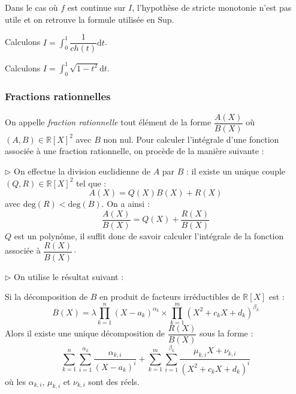 \documentclass[french,11pt,twoside]{VcCours}
\newcommand{\dt}{\text{d}t}
\begin{document}
\begin{Remarque}{} Dans le cas où $f$ est continue sur $I$, l'hypothèse de stricte monotonie n'est pas utile et on retrouve la formule utilisée en Sup.
\end{Remarque}

\newpage
\begin{Exemple} Calculons $I= \int_{0}^1 \dfrac{1}{ch(t)} \dt$.

\vspace*{7cm}
\end{Exemple}

\begin{Exemple} Calculons $I= \int_{0}^1 \sqrt{1-t^2} \dt$.

\vspace*{7cm}
\end{Exemple}


\subsubsection{Fractions rationnelles}

On appelle \emph{fraction rationnelle} tout élément de la forme $\dfrac{A(X)}{B(X)}$ où $(A,B) \in \mathbb{R}[X]^2$ avec $B$ non nul. Pour calculer l'intégrale d'une fonction associée à une fraction rationnelle, on procède de la manière suivante : 

\bigskip

$\rhd$ On effectue la division euclidienne de $A$ par $B$ : il existe un unique couple $(Q,R) \in \mathbb{R}[X]^2$ tel que :
$$ A(X) = Q(X)B(X) + R(X)$$
avec $\textrm{deg}(R)< \textrm{deg}(B)$. On a ainsi :
$$ \dfrac{A(X)}{B(X)} = Q(X) + \dfrac{R(X)}{B(X)}$$
$Q$ est un polynôme, il suffit donc de savoir calculer l'intégrale de la fonction associée à $\dfrac{R(X)}{B(X)} \cdot$

$\rhd$ On utilise le résultat suivant :

\begin{Theoreme}{} Si la décomposition de $B$ en produit de facteurs irréductibles de $\mathbb{R}[X]$ est :
$$ B(X) = \lambda \prod_{k=1}^n (X-a_k)^{\alpha_k} \times \prod_{k=1}^m (X^2+ c_k X + d_k)^{\beta_k} $$
Alors il existe une unique décomposition de $\dfrac{R(X)}{B(X)}$ sous la forme :
$$ \sum_{k=1}^n \sum_{i=1}^{\alpha_k} \frac{\alpha_{k,i}}{(X-a_k)^{i}} + \sum_{k=1}^m \sum_{i=1}^{\beta_k} \dfrac{\mu_{k,i} X + \nu_{k,i}}{(X^2+ c_k X + d_k)^i} $$
où les $\alpha_{k,i}$, $\mu_{k,i}$ et $\nu_{k,i}$ sont des réels.
\end{Theoreme}
\end{document}
